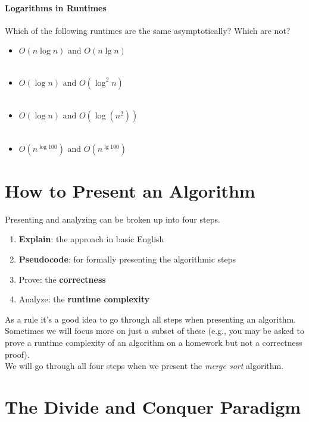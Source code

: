 \documentclass[11  pt]{article}
\begin{document}
\vspace{2cm}

\paragraph{Logarithms in Runtimes}
Which of the following runtimes are the same asymptotically? Which are not?

\begin{itemize}
	\item $O(n \log n)$ and $O(n \lg n)$\\\\
	\item $O(\log n)$ and $O(\log^2 n)$\\\\
	\item $O(\log n)$ and $O(\log (n^2))$\\\\
	\item $O(n^{\log 100})$ and $O(n^{\lg 100})$\\
\end{itemize}
\newpage


\section{How to Present an Algorithm}
Presenting and analyzing can be broken up into four steps.
\begin{enumerate}
	\item \textbf{Explain}: the approach in basic English
	\item \textbf{Pseudocode}: for formally presenting the algorithmic steps
	\item {Prove}: the \textbf{correctness}
	\item {Analyze}: the \textbf{runtime complexity}
\end{enumerate}
As a rule it's a good idea to go through all steps when presenting an algorithm. Sometimes we will focus more on just a subset of these (e.g., you may be asked to prove a runtime complexity of an algorithm on a homework but not a correctness proof). \\ 


We will go through all four steps when we present the \emph{merge sort} algorithm.

\section{The Divide and Conquer Paradigm}
\end{document}
